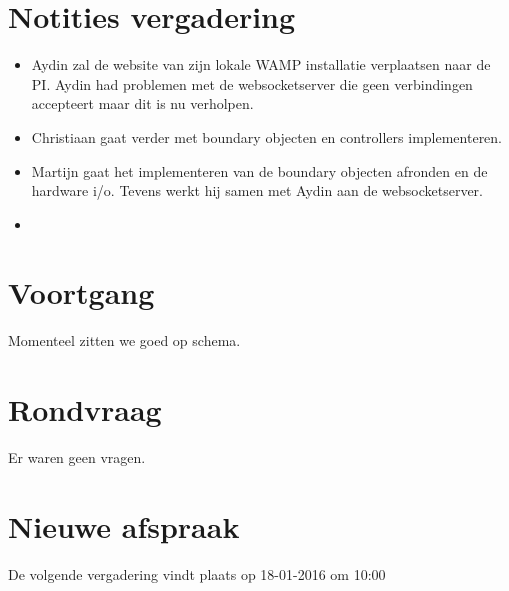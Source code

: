 \documentclass[dutch]{hu}
\begin{document}
\section{Notities vergadering}
\begin{itemize}

\item Aydin zal de website van zijn lokale WAMP installatie verplaatsen naar de PI. Aydin had problemen met de websocketserver die geen verbindingen accepteert maar dit is nu verholpen.
\item Christiaan gaat verder met boundary objecten en controllers implementeren.
\item Martijn gaat het implementeren van de boundary objecten afronden en de hardware i/o. Tevens werkt hij samen met Aydin aan de websocketserver.
\item  

\end{itemize}

\section{Voortgang}
Momenteel zitten we goed op schema.

\section{Rondvraag}
Er waren geen vragen.

\section{Nieuwe afspraak}
De volgende vergadering vindt plaats op 18-01-2016 om 10:00
\end{document}
